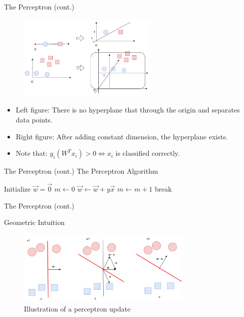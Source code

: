 \documentclass[aspectratio=1610]{beamer}
\begin{document}
\begin{frame}{The Perceptron (cont.)}
    \begin{figure}[h!]
  \includegraphics[width=0.6\textwidth]{Screen Shot 2022-05-21 at 20.31.58.png}
  
\end{figure}
\begin{itemize}
    \item Left figure: There is no hyperplane that through the origin and separates data points.
    \item Right figure: After adding constant dimension, the hyperplane exists.
    \item Note that: $y_i(W^Tx_i) > 0 \iff x_i$ is classified correctly. 
\end{itemize}
\end{frame}

\begin{frame}{The Perceptron (cont.)}
    The Perceptron Algorithm
    \begin{algorithmic}
\State Initialize $\Vec{w} = \Vec{0}$ 
    \State $m \gets 0$ 
         
            \State $\Vec{w} \gets \Vec{w} + y\Vec{x}$ 
            \State $m \gets m + 1$ 
        \EndIf
    \EndFor
        \State break
    \EndIf
\EndWhile

\end{algorithmic}
    
\end{frame}

\begin{frame}{The Perceptron (cont.)}

Geometric Intuition
     \begin{figure}[h!]
  \includegraphics[width=0.75\textwidth]{Screen Shot 2022-05-21 at 21.20.43.png}
  \caption{Illustration of a perceptron update}
  
\end{figure}
\end{frame}
\end{document}
